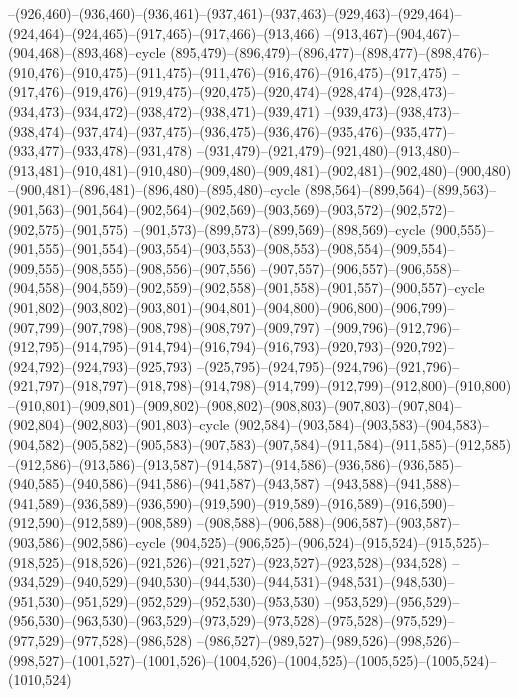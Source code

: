 --(926,460)--(936,460)--(936,461)--(937,461)--(937,463)--(929,463)--(929,464)--(924,464)--(924,465)--(917,465)--(917,466)--(913,466)
--(913,467)--(904,467)--(904,468)--(893,468)--cycle
(895,479)--(896,479)--(896,477)--(898,477)--(898,476)--(910,476)--(910,475)--(911,475)--(911,476)--(916,476)--(916,475)--(917,475)
--(917,476)--(919,476)--(919,475)--(920,475)--(920,474)--(928,474)--(928,473)--(934,473)--(934,472)--(938,472)--(938,471)--(939,471)
--(939,473)--(938,473)--(938,474)--(937,474)--(937,475)--(936,475)--(936,476)--(935,476)--(935,477)--(933,477)--(933,478)--(931,478)
--(931,479)--(921,479)--(921,480)--(913,480)--(913,481)--(910,481)--(910,480)--(909,480)--(909,481)--(902,481)--(902,480)--(900,480)
--(900,481)--(896,481)--(896,480)--(895,480)--cycle
(898,564)--(899,564)--(899,563)--(901,563)--(901,564)--(902,564)--(902,569)--(903,569)--(903,572)--(902,572)--(902,575)--(901,575)
--(901,573)--(899,573)--(899,569)--(898,569)--cycle
(900,555)--(901,555)--(901,554)--(903,554)--(903,553)--(908,553)--(908,554)--(909,554)--(909,555)--(908,555)--(908,556)--(907,556)
--(907,557)--(906,557)--(906,558)--(904,558)--(904,559)--(902,559)--(902,558)--(901,558)--(901,557)--(900,557)--cycle
(901,802)--(903,802)--(903,801)--(904,801)--(904,800)--(906,800)--(906,799)--(907,799)--(907,798)--(908,798)--(908,797)--(909,797)
--(909,796)--(912,796)--(912,795)--(914,795)--(914,794)--(916,794)--(916,793)--(920,793)--(920,792)--(924,792)--(924,793)--(925,793)
--(925,795)--(924,795)--(924,796)--(921,796)--(921,797)--(918,797)--(918,798)--(914,798)--(914,799)--(912,799)--(912,800)--(910,800)
--(910,801)--(909,801)--(909,802)--(908,802)--(908,803)--(907,803)--(907,804)--(902,804)--(902,803)--(901,803)--cycle
(902,584)--(903,584)--(903,583)--(904,583)--(904,582)--(905,582)--(905,583)--(907,583)--(907,584)--(911,584)--(911,585)--(912,585)
--(912,586)--(913,586)--(913,587)--(914,587)--(914,586)--(936,586)--(936,585)--(940,585)--(940,586)--(941,586)--(941,587)--(943,587)
--(943,588)--(941,588)--(941,589)--(936,589)--(936,590)--(919,590)--(919,589)--(916,589)--(916,590)--(912,590)--(912,589)--(908,589)
--(908,588)--(906,588)--(906,587)--(903,587)--(903,586)--(902,586)--cycle
(904,525)--(906,525)--(906,524)--(915,524)--(915,525)--(918,525)--(918,526)--(921,526)--(921,527)--(923,527)--(923,528)--(934,528)
--(934,529)--(940,529)--(940,530)--(944,530)--(944,531)--(948,531)--(948,530)--(951,530)--(951,529)--(952,529)--(952,530)--(953,530)
--(953,529)--(956,529)--(956,530)--(963,530)--(963,529)--(973,529)--(973,528)--(975,528)--(975,529)--(977,529)--(977,528)--(986,528)
--(986,527)--(989,527)--(989,526)--(998,526)--(998,527)--(1001,527)--(1001,526)--(1004,526)--(1004,525)--(1005,525)--(1005,524)--(1010,524)
